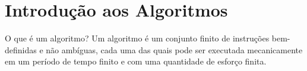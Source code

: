 \section{Introdução aos Algoritmos}

\begin{frame}{O que é um algoritmo?}
Um algoritmo é um conjunto finito de instruções bem-definidas e não ambíguas, cada uma das quais pode ser executada mecanicamente em um período de tempo finito e com uma quantidade de esforço finita.
\end{frame}
